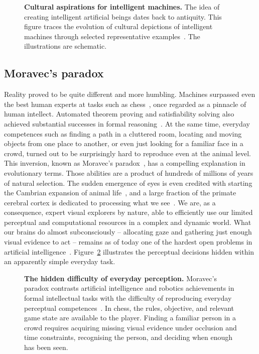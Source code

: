 \begin{figure}[th]
\centering

\caption[Cultural aspirations for intelligent machines]{\textbf{Cultural aspirations for intelligent machines.}
The idea of creating intelligent artificial beings dates back to antiquity. This figure traces the evolution of cultural depictions of intelligent machines through selected representative examples~\cite{mayor2018gods,voskuhl2013androids,lang1927metropolis,lucas1977starwars}. The illustrations are schematic.}
\label{fig:cultural-aspirations}
\end{figure}

\subsection{Moravec's paradox}

Reality proved to be quite different and more humbling. Machines surpassed even the best human experts at tasks such as chess~\cite{campbell2002deep}, once regarded as a pinnacle of human intellect. Automated theorem proving and satisfiability solving also achieved substantial successes in formal reasoning~\cite{davis1960computing,de2008z3}.
At the same time, everyday competences such as finding a path in a cluttered room, locating and moving objects from one place to another, or even just looking for a familiar face in a crowd, turned out to be surprisingly
hard to reproduce even at the animal level. This inversion, known as Moravec's paradox~\cite{moravec1988mind}, has a compelling explanation in evolutionary
terms. Those abilities are a product of hundreds of millions of years of natural selection. The sudden emergence of eyes is even
credited with starting the Cambrian expansion of animal life~\cite{parker2003blink,land2012animal}, and a large fraction of the
primate cerebral cortex is dedicated to processing what we see~\cite{felleman1991distributed}. We are, as a consequence, expert visual explorers by nature, able to efficiently use our limited perceptual and computational resources in a complex and dynamic world. What our brains do
almost subconsciously -- allocating gaze and gathering just enough visual evidence
to act -- remains as of today one of the hardest open problems in artificial intelligence~\cite{dreyfus1992computers}.
Figure~\ref{fig:moravec} illustrates the perceptual decisions hidden within an apparently simple everyday task.

\begin{figure}[th]
\centering

\caption[The hidden difficulty of everyday perception]{\textbf{The hidden difficulty of everyday perception.}
Moravec's paradox contrasts artificial intelligence and robotics achievements in formal intellectual tasks with the difficulty of reproducing everyday perceptual competences~\cite{moravec1988mind}.
In chess, the rules, objective, and relevant game state are available to the player.
Finding a familiar person in a crowd requires acquiring missing visual evidence under occlusion and time constraints, recognising the person, and deciding when enough has been seen.}
\label{fig:moravec}
\end{figure}

